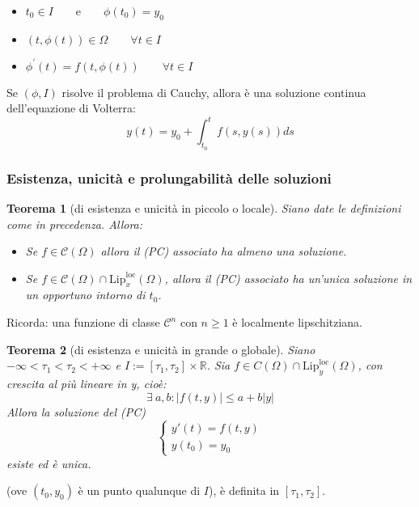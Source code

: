 \documentclass[a4paper,12pt]{article}
\newcommand{\cont}{\mathscr{C}}
\newtheorem{teo}{Teorema}
\begin{document}
\begin{itemize}
\item $t_0 \in I\qquad\text{e}\qquad \phi\left(t_0\right)=y_0$
\item $ \left(t,\phi\left(t\right)\right) \in \Omega \qquad \forall t \in I$
\item $ \phi^{'}\left(t \right) = f\left(t,\phi\left(t\right)\right)\qquad \forall t \in I$
\end{itemize}

Se $\left(\phi,I\right)$ risolve il problema di Cauchy, allora è una soluzione continua dell'equazione di Volterra:
$$ y\left(t\right) = y_0 + \displaystyle\int^t_{t_0} f\left(s,y\left(s\right)\right) ds $$

\subsubsection{Esistenza, unicità e prolungabilità delle soluzioni}

\begin{teo}[di esistenza e unicità in piccolo o locale]
Siano date le definizioni come in precedenza. Allora:
\begin{itemize}
 \item Se $f \in \cont \left(\Omega\right)$ allora il (PC) associato ha almeno una soluzione.
 \item Se $f \in \cont \left(\Omega\right) \cap \text{Lip}^{\text{loc}}_x\left(\Omega\right)$, allora il (PC) associato ha un'unica soluzione in un opportuno intorno di $t_0$.\\
\end{itemize}
\end{teo}
Ricorda: una funzione di classe $\cont^n$ con $ n \geq 1 $ è localmente lipschitziana. 

\begin{teo}[di esistenza e unicità in grande o globale]
Siano $-\infty < \tau_1 < \tau_2 < +\infty$ e $I:=\left[\tau_1,\tau_2\right]\times\mathbb{R}$. Sia $f \in C\left(\Omega\right) \cap \text{Lip}^{\text{loc}}_y\left(\Omega\right)$, con crescita al più lineare in y, cioè:
$$\exists\ a,b: |f \left(t,y\right)|\leq a + b|y|$$
Allora la soluzione del (PC)
$$\begin{cases} y'(t)=f\left(t,y\right) \\ y\left(t_0\right)=y_0 \end{cases}$$
esiste ed è unica.
\end{teo}

(ove $\left(t_0,y_0\right)$ è un punto qualunque di $I$), è definita in $\left[\tau_1,\tau_2\right]$.
\end{document}

